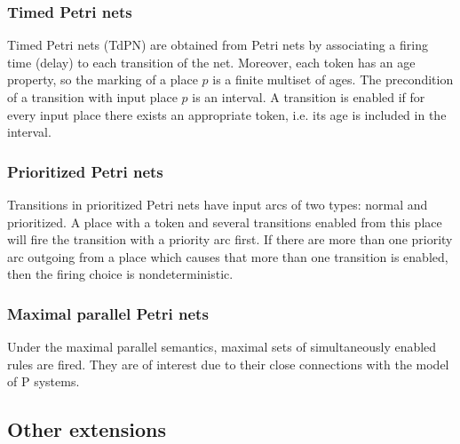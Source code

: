 
\subsubsection{Timed Petri nets} %
\label{ssub:timed_petri_nets}

 Timed Petri nets (TdPN) are obtained from Petri nets by associating a firing time (delay) to each transition of the net. Moreover, each token has an age property, so the marking of a place $p$ is a finite multiset of ages. The precondition of a transition with input place $p$ is an interval. A transition is enabled if for every input place there exists an appropriate token, i.e. its age is included in the interval.


\subsubsection{Prioritized Petri nets} %
\label{ssub:prioritized_petri_nets}

 Transitions in prioritized Petri nets have input arcs of two types: normal and prioritized. A place with a token and several transitions enabled from this place will fire the transition with a priority arc first. If there are more than one priority arc outgoing from a place which causes that more than one transition is enabled, then the firing choice is nondeterministic.


\subsubsection{Maximal parallel Petri nets} %
\label{ssub:maximal_parallel_petri_nets}

 Under the maximal parallel semantics, maximal sets of simultaneously enabled rules are fired. They are of interest due to their close connections with the model of P systems.



\subsection{Other extensions} %
\label{sub:other_extensions}

